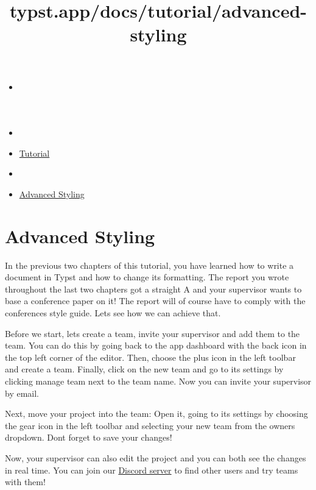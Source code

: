 \title{typst.app/docs/tutorial/advanced-styling}

\begin{itemize}
\tightlist
\item
  \href{/docs}{}
\item
  
\item
  \href{/docs/tutorial/}{Tutorial}
\item
  
\item
  \href{/docs/tutorial/advanced-styling/}{Advanced Styling}
\end{itemize}

\section{Advanced Styling}\label{advanced-styling}

In the previous two chapters of this tutorial, you have learned how to
write a document in Typst and how to change its formatting. The report
you wrote throughout the last two chapters got a straight A and your
supervisor wants to base a conference paper on it! The report will of
course have to comply with the conference\textquotesingle s style guide.
Let\textquotesingle s see how we can achieve that.

Before we start, let\textquotesingle s create a team, invite your
supervisor and add them to the team. You can do this by going back to
the app dashboard with the back icon in the top left corner of the
editor. Then, choose the plus icon in the left toolbar and create a
team. Finally, click on the new team and go to its settings by clicking
\textquotesingle manage team\textquotesingle{} next to the team name.
Now you can invite your supervisor by email.


Next, move your project into the team: Open it, going to its settings by
choosing the gear icon in the left toolbar and selecting your new team
from the owners dropdown. Don\textquotesingle t forget to save your
changes!

Now, your supervisor can also edit the project and you can both see the
changes in real time. You can join our
\href{https://discord.gg/2uDybryKPe}{Discord server} to find other users
and try teams with them!

